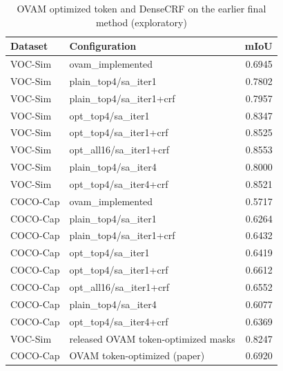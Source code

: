 \begin{table}[H]\centering\scriptsize\setlength{\tabcolsep}{3pt}
\begin{tabular}{>{\raggedright\arraybackslash}p{1.92cm}>{\raggedright\arraybackslash}p{7.05cm}r}
\toprule
Dataset & Configuration & mIoU \\
\midrule
VOC-Sim & ovam\_\allowbreak{}implemented & 0.6945 \\
VOC-Sim & plain\_\allowbreak{}top4/\allowbreak{}sa\_\allowbreak{}iter1 & 0.7802 \\
VOC-Sim & plain\_\allowbreak{}top4/\allowbreak{}sa\_\allowbreak{}iter1+crf & 0.7957 \\
VOC-Sim & opt\_\allowbreak{}top4/\allowbreak{}sa\_\allowbreak{}iter1 & 0.8347 \\
VOC-Sim & opt\_\allowbreak{}top4/\allowbreak{}sa\_\allowbreak{}iter1+crf & 0.8525 \\
VOC-Sim & opt\_\allowbreak{}all16/\allowbreak{}sa\_\allowbreak{}iter1+crf & 0.8553 \\
VOC-Sim & plain\_\allowbreak{}top4/\allowbreak{}sa\_\allowbreak{}iter4 & 0.8000 \\
VOC-Sim & opt\_\allowbreak{}top4/\allowbreak{}sa\_\allowbreak{}iter4+crf & 0.8521 \\
COCO-Cap & ovam\_\allowbreak{}implemented & 0.5717 \\
COCO-Cap & plain\_\allowbreak{}top4/\allowbreak{}sa\_\allowbreak{}iter1 & 0.6264 \\
COCO-Cap & plain\_\allowbreak{}top4/\allowbreak{}sa\_\allowbreak{}iter1+crf & 0.6432 \\
COCO-Cap & opt\_\allowbreak{}top4/\allowbreak{}sa\_\allowbreak{}iter1 & 0.6419 \\
COCO-Cap & opt\_\allowbreak{}top4/\allowbreak{}sa\_\allowbreak{}iter1+crf & 0.6612 \\
COCO-Cap & opt\_\allowbreak{}all16/\allowbreak{}sa\_\allowbreak{}iter1+crf & 0.6552 \\
COCO-Cap & plain\_\allowbreak{}top4/\allowbreak{}sa\_\allowbreak{}iter4 & 0.6077 \\
COCO-Cap & opt\_\allowbreak{}top4/\allowbreak{}sa\_\allowbreak{}iter4+crf & 0.6369 \\
VOC-Sim & released OVAM token-optimized masks & 0.8247 \\
COCO-Cap & OVAM token-optimized (paper) & 0.6920 \\
\bottomrule
\end{tabular}
\caption{OVAM optimized token and DenseCRF on the earlier final method (exploratory)}\label{tab:b_token_crf}
\end{table}
